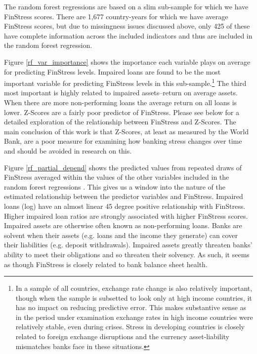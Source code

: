 \documentclass[]{article}
\begin{document}
The random forest regressions are based on a slim sub-sample for which we have FinStress scores. There are 1,677 country-years for which we have average FinStress scores, but due to missingness issues discussed above, only 425 of these have complete information across the included indicators and thus are included in the random forest regression.

Figure \ref{rf_var_importance} shows the importance each variable plays on average for predicting FinStress levels. Impaired loans are found to be the most important variable for predicting FinStress levels in this sub-sample.\footnote{In a sample of all countries, exchange rate change is also relatively important, though when the sample is subsetted to look only at high income countries, it has no impact on reducing predictive error. This makes substantive sense as in the period under examination exchange rates in high income countries were relatively stable, even during crises. Stress in developing countries is closely related to foreign exchange disruptions and the currency asset-liability mismatches banks face in these situations.} The third most important is highly related to impaired assets--return on average assets. When there are more non-performing loans the average return on all loans is lower. Z-Scores are a fairly poor predictor of FinStress. Please see below for a detailed exploration of the relationship between FinStress and Z-Scores. The main conclusion of this work is that Z-Scores, at least as measured by the World Bank, are a poor measure for examining how banking stress changes over time and should be avoided in research on this.

Figure \ref{rf_partial_depend} shows the predicted values from repeated draws of FinStress averaged within the values of the other variables included in the random forest regressions \citep[see][14]{jones2015}. This gives us a window into the nature of the estimated relationship between the predictor variables and FinStress. Impaired loans (log) have an almost linear 45 degree positive relationship with FinStress. Higher impaired loan ratios are strongly associated with higher FinStress scores. Impaired assets are otherwise often known as non-performing loans. Banks are solvent when their assets (e.g. loans and the income they generate) can cover their liabilities (e.g. deposit withdrawals). Impaired assets greatly threaten banks' ability to meet their obligations and so threaten their solvency. As such, it seems as though FinStress is closely related to bank balance sheet health.
\end{document}
